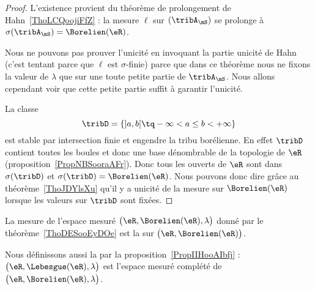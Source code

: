 \begin{proof}

	L'existence provient du théorème de prolongement de Hahn~\ref{ThoLCQoojiFfZ} : la mesure \( \ell\) sur \( (\tribA_{\mS})\) se prolonge à \( \sigma(\tribA_{\mS})=\Borelien(\eR)\).

	Nous ne pouvons pas prouver l'unicité en invoquant la partie unicité de Hahn (c'est tentant parce que \( \ell\) est \( \sigma\)-finie) parce que dans ce théorème nous ne fixons la valeur de \( \lambda\) que sur une toute petite partie de \( \tribA_{\mS}\). Nous allons cependant voir que cette petite partie suffit à garantir l'unicité.

	La classe
	\begin{equation}
		\tribD=\{ \mathopen] a , b \mathclose[\tq -\infty<a\leq b< +\infty \}
	\end{equation}
	est stable par intersection finie et engendre la tribu borélienne. En effet \( \tribD\) contient toutes les boules et donc une base dénombrable de la topologie de \( \eR\) (proposition~\ref{PropNBSooraAFr}). Donc tous les ouverts de \( \eR\) sont dans \( \sigma(\tribD)\) et \( \sigma(\tribD)=\Borelien(\eR)\). Nous pouvons donc dire grâce au théorème~\ref{ThoJDYlsXu} qu'il y a unicité de la mesure sur \( \Borelien(\eR)\) lorsque les valeurs sur \( \tribD\) sont fixées.
\end{proof}

\begin{definition}      \label{DefooYZSQooSOcyYN}
	La mesure de l'espace mesuré \( \big( \eR,\Borelien(\eR),\lambda \big)\) donné par le théorème~\ref{ThoDESooEyDOe} est la  sur \( \big( \eR,\Borelien(\eR) \big)\).

	Nous définissons aussi la  par la proposition~\ref{PropIIHooAIbfj} : \( \big( \eR,\Lebesgue(\eR),\lambda \big)\) est l'espace mesuré complété de \( \big( \eR,\Borelien(\eR), \lambda \big)\).
\end{definition}


